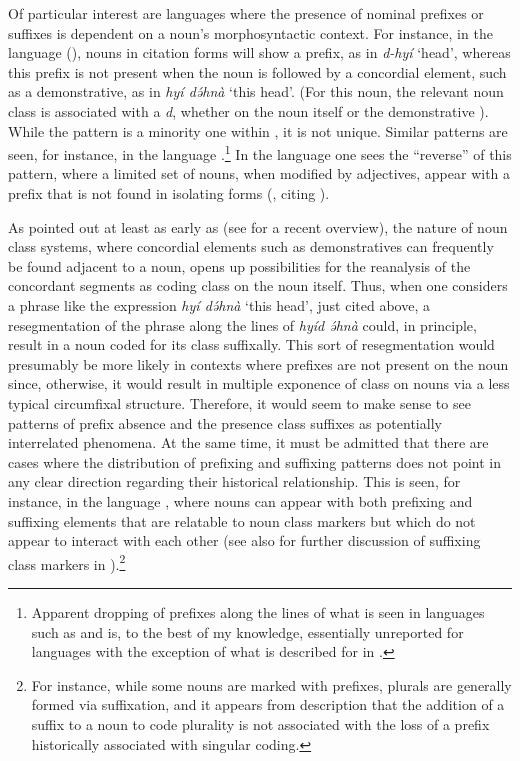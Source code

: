 \documentclass[output=paper ,collection	  ,collectionchapter ,biblatexbackend=biber   ]{langscibook}
\begin{document}
\newpage 
Of particular interest are languages where the presence of nominal prefixes or
suffixes is dependent on a noun's morphosyntactic context. For instance, in the
 language  (), nouns in citation forms will show a prefix,
as in \emph{d-hyí} `head', whereas this prefix is not present when the noun is
followed by a concordial element, such as a demonstrative, as in \emph{hyí
d{\'ə}hnà} `this head'. (For this noun, the relevant noun class is associated
with a \emph{d}, whether on the noun itself or the demonstrative
\cite[247]{Hoffman1967}). While the  pattern is a minority one within
, it is not unique. Similar patterns are seen, for instance,
in the  language 
\cite[56--58]{Hyman1979phonology}.{\footnote{Apparent dropping of prefixes along the
lines of what is seen in languages such as  and  is, to the best of my
knowledge, essentially unreported for  languages with the exception of what
is described for  in .}} In the 
language  one sees the ``reverse'' of this pattern, where a limited set of
nouns, when modified by adjectives, appear with a prefix that is not found in
isolating forms (, citing
).

As pointed out at least as early as  (see
 for a recent overview), the nature of
 noun class systems, where concordial elements such as demonstratives
can frequently be found adjacent to a noun, opens up possibilities for the
reanalysis of the concordant segments as coding class on the noun itself. Thus,
when one considers a phrase like the  expression \emph{hyí d{\'ə}hnà}
`this head', just cited above, a resegmentation of the phrase along the lines of
\emph{hyíd {\'ə}hnà} could, in principle, result in a noun coded for its class
suffixally. This sort of resegmentation would presumably be more likely in
contexts where prefixes are not present on the noun since, otherwise, it would
result in multiple exponence of class on nouns via a less typical circumfixal
structure. Therefore, it would seem to make sense to see patterns of prefix
absence and the presence class suffixes as potentially interrelated phenomena.
At the same time, it must be admitted that there are cases where the
distribution of prefixing and suffixing patterns does not point in any clear
direction regarding their historical relationship. This is seen, for instance,
in the  language , where nouns can appear with both prefixing and
suffixing elements that are relatable to  noun class markers
but which do not appear to interact with each other \cite[69--71]{Thwing1987}
(see also  for further discussion of suffixing
class markers in ).{\footnote{For instance, while some nouns are marked
with prefixes, plurals are generally formed via suffixation, and it appears from
 description that the addition of a suffix to a noun to
code plurality is not associated with the loss of a prefix historically
associated with singular coding.}}
\end{document}
